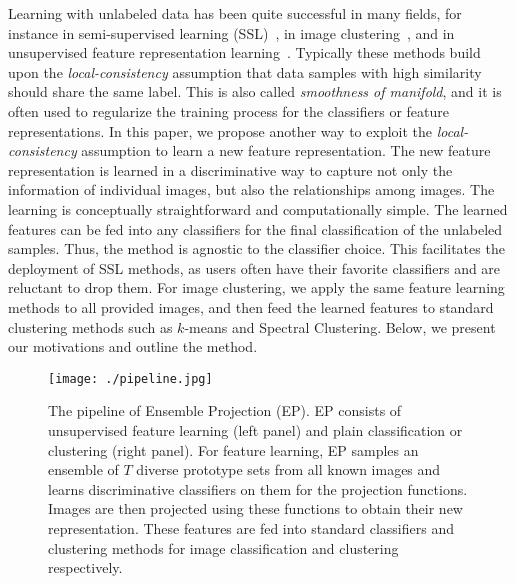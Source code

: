 \documentclass[preprint,12pt,3p]{elsarticle}
\begin{document}
Learning with unlabeled data has been quite successful in many fields, for instance in semi-supervised learning 
(SSL)~\citep{Zhou:nips:04, deep:semi:embedding, Fergus09, SemiForest, Zhu:ISL:2009, 
nips14:ssl}, in image clustering~\cite{Grauman06, Frey_AffinityPropagation, dai}, and in 
unsupervised feature representation learning~\cite{stl-10, cnnfet14, feature:LSTM, feature:video}. 
Typically these methods build upon the
\emph{local-consistency} assumption that data samples with high
similarity should share the same label. This is also called
\emph{smoothness of manifold}, and it is often used to regularize the training process for the classifiers or feature
 representations.  
In this paper, we propose another way to exploit the \emph{local-consistency} assumption to 
learn a new feature representation. 
The new feature
representation is learned in a discriminative way to capture not only
the information of individual images, but also the relationships among
images. The learning is conceptually straightforward and
computationally simple. The learned features can be fed into any
classifiers for the final classification of the unlabeled samples.
Thus, the method is agnostic to the classifier choice. This facilitates the
deployment of SSL methods, as users often have their favorite
classifiers and are reluctant to drop them. For image clustering, we
apply the same feature learning methods to all provided images, and
then feed the learned features to standard clustering methods such as
$k$-means and Spectral Clustering.  Below, we present our motivations
and outline the method.



\begin{figure*}[t]
  \centering
  \texttt{[image: ./pipeline.jpg]}
  \caption{The pipeline of Ensemble Projection (EP). EP consists of
    unsupervised feature learning (left panel) and plain
    classification or clustering (right panel). For feature learning,
    EP samples an ensemble of $T$ diverse prototype sets from all
    known images and learns discriminative classifiers on them for the
    projection functions. Images are then projected using these
    functions to obtain their new representation. These features are
    fed into standard classifiers and clustering methods for image
    classification and clustering respectively.}
\label{fig:pipeline}
\end{figure*}
\end{document}
